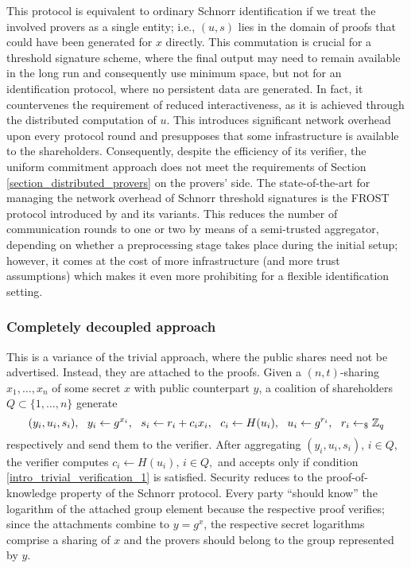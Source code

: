 \documentclass{iacrtrans}
\begin{document}
This protocol is equivalent to ordinary Schnorr identification
if we treat the involved provers as a single entity;
i.e., $(u, s)$ lies in the domain
of proofs that could have been generated
for $x$ directly.
This commutation is crucial for
a threshold signature scheme,
where the final output may need to
remain available in the long run
and consequently use minimum space,
but not for an identification protocol,
where no persistent data are generated.
In fact, it countervenes the requirement
of reduced interactiveness, as it is achieved through
the distributed computation of $u$.
This introduces significant
network overhead upon every protocol round and
presupposes that some infrastructure is available
to the shareholders.
Consequently, despite the efficiency of its verifier,
the uniform commitment approach does not meet the requirements
of Section \ref{section_distributed_provers} on the provers' side.
The state-of-the-art for managing the network overhead
of Schnorr threshold signatures
is the FROST protocol introduced by \cite{paper_frost}
and its variants.
This reduces the number of communication rounds
to one or two by means of a semi-trusted aggregator,
depending on whether
a preprocessing stage takes place during the initial setup;
however, it comes at the cost of more
infrastructure (and more trust assumptions)
which makes it even more
prohibiting for a flexible identification setting.

\subsubsection{Completely decoupled approach}\label{section_decoupled_commitment}

This is a variance of the trivial approach,
where the public shares
need not be advertised.
Instead, they are attached to the proofs.
Given a $(n, t)$-sharing
$x_1, \dots, x_n$ of some secret $x$
with public counterpart $y$,
a coalition of shareholders
$Q \subset \{1, \dots, n\}$
generate
\vspace{5pt}
\begin{equation*}
(y_i, u_i, s_i),
\ \ y_i \leftarrow g ^ {x_i},
\ \ s_i \leftarrow r_i + c_i x_i,
\ \ c_i \leftarrow H(u_i),
\ \ u_i \leftarrow g ^ {r_i},
\ \ r_i \leftarrow_\$ \mathbb{Z}_q
\vspace{5pt}
\end{equation*}
respectively
and send them to the verifier.
After aggregating
$(y_i, u_i, s_i)$, $i \in Q$,
the verifier computes $c_i \leftarrow H(u_i),\hspace{2pt} i \in Q,$
and accepts only if condition
\eqref{intro_trivial_verification_1}
is satisfied.
Security reduces to the proof-of-knowledge
property of the Schnorr protocol.
Every party ``should know''
the logarithm of the attached group element
because the respective proof verifies;
since the attachments combine to $y = g ^ x$,
the respective secret logarithms comprise a sharing of
$x$ and the provers should belong to the group
represented by $y$.
\end{document}
